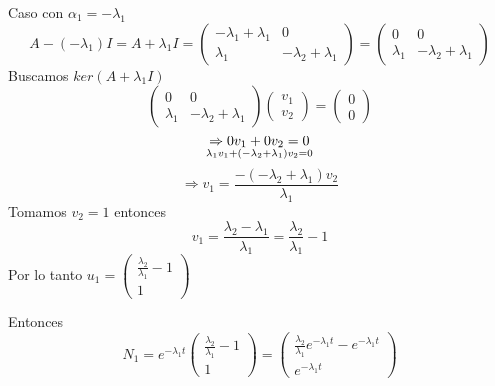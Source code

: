 Caso con $\alpha_{1}=-\lambda_{1}$
\begin{equation*}
     A - (-\lambda_{1}) I = A + \lambda_{1} I =
     \begin{pmatrix}
     -\lambda_{1}  +\lambda_{1} & 0 \\
    \lambda_{1} & -\lambda_{2} +\lambda_{1}
     \end{pmatrix}
     =
     \begin{pmatrix}
     0 & 0\\
      \lambda_{1} & -\lambda_{2} +\lambda_{1}
     \end{pmatrix}
\end{equation*}
Buscamos $ker(A + \lambda_{1} I)$
\begin{equation*}
\begin{pmatrix}
     0 & 0\\
      \lambda_{1} & -\lambda_{2} +\lambda_{1}
     \end{pmatrix}
\begin{pmatrix}
v_{1}   \\
v_{2}  
\end{pmatrix} =
\begin{pmatrix}
0   \\
0  
\end{pmatrix}
\end{equation*}
\begin{equation*}
    \Rightarrow 0v_{1}+ 0v_{2}=0 \atop
    \lambda_{1} v_{1} +(-\lambda_{2} +\lambda_{1}) v_{2} =0
\end{equation*}
\begin{equation*}
    \Rightarrow v_{1}=\frac{-(-\lambda_{2} +\lambda_{1}) v_{2}}{\lambda_{1}}
\end{equation*}
Tomamos $v_{2}=1$ entonces
\begin{equation*}
  v_{1}=\frac{\lambda_{2} -\lambda_{1}}{\lambda_{1}}= \frac{\lambda_{2}}{\lambda_{1}} - 1
\end{equation*}
Por lo tanto $u_{1}= 
\begin{pmatrix}
\frac{\lambda_{2}}{\lambda_{1}} - 1 \\
1
\end{pmatrix}$

Entonces
\begin{equation*}
  N_{1}=e^{-\lambda_{1}t}
\begin{pmatrix}
\frac{\lambda_{2}}{\lambda_{1}} - 1 \\
1
\end{pmatrix}
=
\begin{pmatrix}
\frac{\lambda_{2}}{\lambda_{1}}e^{-\lambda_{1}t} - e^{-\lambda_{1}t} \\
e^{-\lambda_{1}t}
\end{pmatrix}  
\end{equation*}

